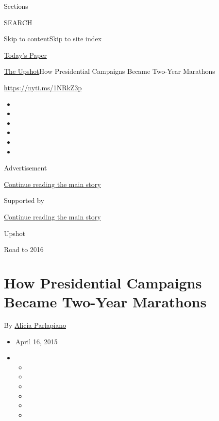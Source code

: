 Sections

SEARCH

\protect\hyperlink{site-content}{Skip to
content}\protect\hyperlink{site-index}{Skip to site index}

\href{https://myaccount.nytimes3xbfgragh.onion/auth/login?response_type=cookie\&client_id=vi}{}

\href{https://www.nytimes3xbfgragh.onion/section/todayspaper}{Today's
Paper}

\href{/section/upshot}{The Upshot}\textbar{}How Presidential Campaigns
Became Two-Year Marathons

\url{https://nyti.ms/1NRkZ3p}

\begin{itemize}
\item
\item
\item
\item
\item
\item
\end{itemize}

Advertisement

\protect\hyperlink{after-top}{Continue reading the main story}

Supported by

\protect\hyperlink{after-sponsor}{Continue reading the main story}

Upshot

Road to 2016

\hypertarget{how-presidential-campaigns-became-two-year-marathons}{%
\section{How Presidential Campaigns Became Two-Year
Marathons}\label{how-presidential-campaigns-became-two-year-marathons}}

By \href{https://www.nytimes3xbfgragh.onion/by/alicia-parlapiano}{Alicia
Parlapiano}

\begin{itemize}
\item
  April 16, 2015
\item
  \begin{itemize}
  \item
  \item
  \item
  \item
  \item
  \item
  \end{itemize}
\end{itemize}

